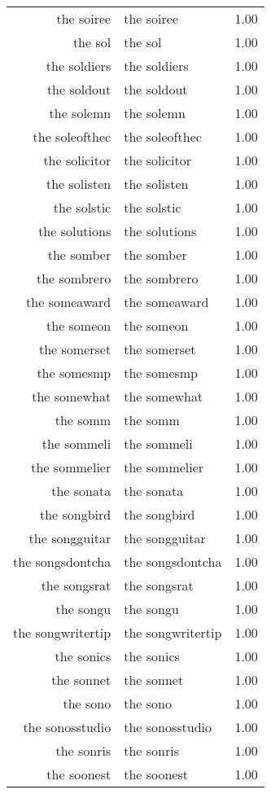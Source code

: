 \begin{table}[ht]
\begin{tabular}{rlr}
  the soiree & the soiree & 1.00 \\ 
  the sol & the sol & 1.00 \\ 
  the soldiers & the soldiers & 1.00 \\ 
  the soldout & the soldout & 1.00 \\ 
  the solemn & the solemn & 1.00 \\ 
  the soleofthec & the soleofthec & 1.00 \\ 
  the solicitor & the solicitor & 1.00 \\ 
  the solisten & the solisten & 1.00 \\ 
  the solstic & the solstic & 1.00 \\ 
  the solutions & the solutions & 1.00 \\ 
  the somber & the somber & 1.00 \\ 
  the sombrero & the sombrero & 1.00 \\ 
  the someaward & the someaward & 1.00 \\ 
  the someon & the someon & 1.00 \\ 
  the somerset & the somerset & 1.00 \\ 
  the somesmp & the somesmp & 1.00 \\ 
  the somewhat & the somewhat & 1.00 \\ 
  the somm & the somm & 1.00 \\ 
  the sommeli & the sommeli & 1.00 \\ 
  the sommelier & the sommelier & 1.00 \\ 
  the sonata & the sonata & 1.00 \\ 
  the songbird & the songbird & 1.00 \\ 
  the songguitar & the songguitar & 1.00 \\ 
  the songsdontcha & the songsdontcha & 1.00 \\ 
  the songsrat & the songsrat & 1.00 \\ 
  the songu & the songu & 1.00 \\ 
  the songwritertip & the songwritertip & 1.00 \\ 
  the sonics & the sonics & 1.00 \\ 
  the sonnet & the sonnet & 1.00 \\ 
  the sono & the sono & 1.00 \\ 
  the sonosstudio & the sonosstudio & 1.00 \\ 
  the sonris & the sonris & 1.00 \\ 
  the soonest & the soonest & 1.00 \\ 

\end{tabular}
\end{table}
